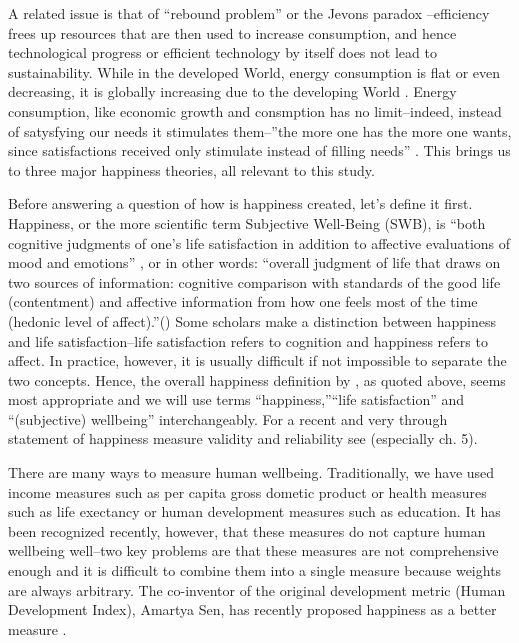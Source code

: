 \documentclass[10pt, letterpaper]{article}
\begin{document}
\begin{spacing}{1.4}
A related issue is that of ``rebound problem'' or the Jevons paradox
\citep{pretty13}%
--efficiency frees up resources that are then used to increase consumption, and
hence technological progress or efficient technology by itself does not lead to
sustainability. While in the developed World, energy consumption is flat or even
decreasing, it is globally increasing due to the developing World
\citep{pretty13}. Energy consumption, like economic growth and consmption has no
limit--indeed, instead of satysfying our needs it stimulates them--''the more
one has the more one wants, since satisfactions received only stimulate instead
of filling needs''   \citep{durkheim50}. This brings us to three major happiness
theories, all relevant to this study. 




Before answering a question of how is happiness created, let's define it first. 
  Happiness, or the more scientific term Subjective Well-Being (SWB), is ``both cognitive judgments of one's life
satisfaction in addition to affective evaluations of mood and
emotions'' \citep[p. 142]{steel08},  or in other words: ``overall judgment of life that draws on two sources of information:
  cognitive comparison with standards of the good life (contentment) and
  affective information from how one feels most of the time (hedonic
  level of affect).''(\citep[p. 2]{veenhoven08})
 Some scholars make a
  distinction between happiness and life satisfaction--life
  satisfaction refers to cognition and happiness refers to affect. In practice,
  however, it is usually difficult  if not impossible to separate the two
  concepts.  Hence, the overall happiness definition by 
   \citet{veenhoven08}, as quoted above,  seems most appropriate and we will use terms
   ``happiness,''``life satisfaction'' and ``(subjective) wellbeing'' interchangeably.  For a recent and very through statement of
happiness measure validity and reliability see \citet{diener09}
(especially ch. 5). 

There are many ways to measure human wellbeing. Traditionally, we have used
income measures such as per capita gross dometic product or health measures such
as life exectancy or human development measures such as education. %
 It has been recognized recently, however, that these measures do not capture
 human wellbeing well--two key problems are that these measures are not
 comprehensive enough and it is difficult to combine them into a single measure
 because weights are always arbitrary. The co-inventor of the original
 development metric (Human Development Index), Amartya Sen, has recently
 proposed happiness as a better measure \citep{stiglitz09al}.


\end{spacing}
\end{document}
